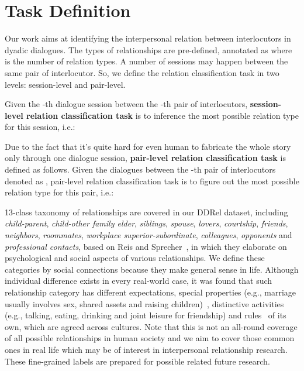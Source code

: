 \documentclass[letterpaper]{article} \usepackage{aaai21}  \usepackage{times}  \usepackage{helvet} \usepackage{courier}  \usepackage[hyphens]{url}  \usepackage{graphicx} \usepackage{xcolor}
\begin{document}
 
\section{Task Definition}
\label{sec:task}

Our work aims at identifying the interpersonal relation between interlocutors in dyadic dialogues. 
The types of relationships are pre-defined, annotated as  where  is the number of relation types.
A number of sessions may happen between the same pair of interlocutor. So, we define the relation classification task in two levels: session-level and pair-level.

Given the -th dialogue session  between the -th pair of interlocutors,  \textbf{session-level relation classification task} is to inference the most possible relation type for this session, i.e.:


Due to the fact that it's quite hard for even human to fabricate the whole story only through one dialogue session, \textbf{pair-level relation classification task} is defined as follows. Given the dialogues between the -th pair of interlocutors denoted as , pair-level relation classification task is to figure out the most possible relation type for this pair, i.e.:



13-class taxonomy of relationships are covered in our DDRel dataset, 
including {\em child-parent}, {\em child-other family elder}, {\em siblings}, {\em spouse}, {\em lovers}, {\em courtship}, {\em friends}, {\em neighbors}, {\em roommates}, 
{\em workplace superior-subordinate}, {\em colleagues}, {\em opponents} and 
{\em professional contacts},
based on Reis and Sprecher~\cite{reis2009encyclopedia}, 
in which they elaborate on psychological 
and social aspects of various relationships. 
We define these categories by social connections because they make general 
sense in life. Although individual difference exists 
in every real-world case, it was found that such relationship category 
has different expectations, 
special properties (e.g., marriage usually involves sex, 
shared assets and raising children)~\cite{argyle1983sources}, 
distinctive activities (e.g., talking, eating, drinking and 
joint leisure for friendship) and 
rules~\cite{argyle1984rules} of its own, which are agreed across cultures.
Note that this is not an all-round coverage of 
all possible relationships in human society 
and we aim to cover those common
ones in real life which may be of interest in interpersonal 
relationship research.
These fine-grained labels are prepared for possible related future research.
\end{document}
